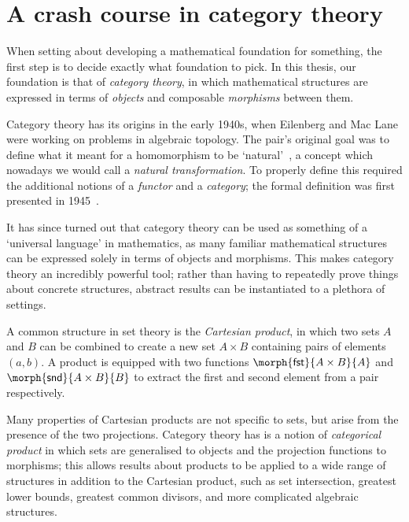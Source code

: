 \chapter{A crash course in category theory}

When setting about developing a mathematical foundation for something,
the first step is to decide exactly what foundation to pick.
In this thesis, our foundation is that of \emph{category theory}, in which
mathematical structures are expressed in terms of \emph{objects} and composable
\emph{morphisms} between them.

Category theory has its origins in the early 1940s, when Eilenberg and Mac Lane
were working on problems in algebraic topology.
The pair's original goal was to define what it meant for a homomorphism to be
`natural'~\cite{eilenberg1942natural}, a concept which nowadays we would call a
\emph{natural transformation}.
To properly define this required the additional notions of a \emph{functor}
and a \emph{category}; the formal definition was first presented in
1945~\cite{eilenberg1945general}.

It has since turned out that category theory can be used as something of a
`universal language' in mathematics, as many familiar mathematical structures
can be expressed solely in terms of objects and morphisms.
This makes category theory an incredibly powerful tool; rather than having to
repeatedly prove things about concrete structures, abstract results can be
instantiated to a plethora of settings.

\begin{example}
    A common structure in set theory is the \emph{Cartesian product}, in
    which two sets \(A\) and \(B\) can be combined to create a new set
    \(A \times B\) containing pairs of elements \((a,b)\).
    A product is equipped with two functions
    \(\morph{\mathsf{fst}}{A \times B}{A}\) and
    \(\morph{\mathsf{snd}}{A \times B}{B}\) to extract the first and second
    element from a pair respectively.

    Many properties of Cartesian products are not specific to sets,
    but arise from the presence of the two projections.
    Category theory has is a notion of \emph{categorical product} in which
    sets are generalised to objects and the projection functions to morphisms;
    this allows results about products to be applied to a wide range of
    structures in addition to the Cartesian product, such as set intersection,
    greatest lower bounds, greatest common divisors, and more complicated
    algebraic structures.
\end{example}

